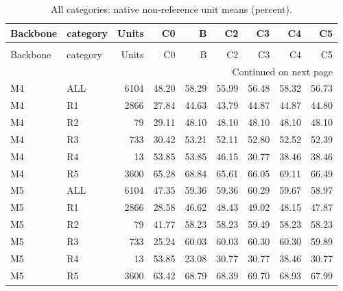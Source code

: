 \begin{longtable}{llrrrrrrr}
\caption{All categories: native non-reference unit means (percent).} \label{tab:categories} \\
\toprule
Backbone & category & Units & C0 & B & C2 & C3 & C4 & C5 \\
\midrule
\endfirsthead
\caption[]{All categories: native non-reference unit means (percent).} \\
\toprule
Backbone & category & Units & C0 & B & C2 & C3 & C4 & C5 \\
\midrule
\endhead
\midrule
\multicolumn{9}{r}{Continued on next page} \\
\midrule
\endfoot
\bottomrule
\endlastfoot
M4 & ALL & 6104 & 48.20 & 58.29 & 55.99 & 56.48 & 58.32 & 56.73 \\
M4 & R1 & 2866 & 27.84 & 44.63 & 43.79 & 44.87 & 44.87 & 44.80 \\
M4 & R2 & 79 & 29.11 & 48.10 & 48.10 & 48.10 & 48.10 & 48.10 \\
M4 & R3 & 733 & 30.42 & 53.21 & 52.11 & 52.80 & 52.52 & 52.39 \\
M4 & R4 & 13 & 53.85 & 53.85 & 46.15 & 30.77 & 38.46 & 38.46 \\
M4 & R5 & 3600 & 65.28 & 68.84 & 65.61 & 66.05 & 69.11 & 66.49 \\
M5 & ALL & 6104 & 47.35 & 59.36 & 59.36 & 60.29 & 59.67 & 58.97 \\
M5 & R1 & 2866 & 28.58 & 46.62 & 48.43 & 49.02 & 48.15 & 47.87 \\
M5 & R2 & 79 & 41.77 & 58.23 & 58.23 & 59.49 & 58.23 & 58.23 \\
M5 & R3 & 733 & 25.24 & 60.03 & 60.03 & 60.30 & 60.30 & 59.89 \\
M5 & R4 & 13 & 53.85 & 23.08 & 30.77 & 30.77 & 38.46 & 30.77 \\
M5 & R5 & 3600 & 63.42 & 68.79 & 68.39 & 69.70 & 68.93 & 67.99 \\
\end{longtable}
